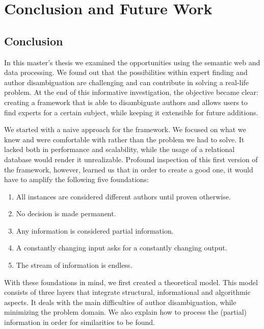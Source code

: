 \chapter{Conclusion and Future Work}
\label{conclusion}


\section{Conclusion}

In this master's thesis we examined the opportunities using the semantic web and data processing. We found out that the possibilities within expert finding and author disambiguation are challenging and can contribute in solving a real-life problem. At the end of this informative investigation, the objective became clear: creating a framework that is able to disambiguate authors and allows users to find experts for a certain subject, while keeping it extensible for future additions.


We started with a naive approach for the framework. We focused on what we knew and were comfortable with rather than the problem we had to solve. It lacked both in performance and scalability, while the usage of a relational database would render it unrealizable. Profound inspection of this first version of the framework, however, learned us that in order to create a good one, it would have to amplify the following five foundations:

\begin{enumerate}
	\item All instances are considered different authors until proven otherwise.
	\item No decision is made permanent.
	\item Any information is considered partial information.
	\item A constantly changing input asks for a constantly changing output.
	\item The stream of information is endless.
\end{enumerate}


With these foundations in mind, we first created a theoretical model. This model consists of three layers that integrate structural, informational and algorithmic aspects. It deals with the main difficulties of author disambiguation, while minimizing the problem domain. We also explain how to process the (partial) information in order for similarities to be found. 

